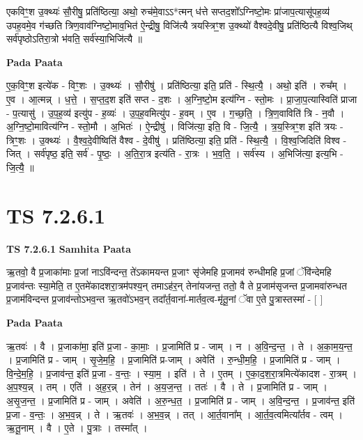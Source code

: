 \documentclass[17pt]{extarticle}
\begin{document}
एकविꣳ॒॒श उ॒क्थ्यः॑ सौ॒रीषु॒ प्रति॑ष्ठित्या॒ अथो॒ रुच॑मे॒वाऽऽ*त्मन् ध॑त्ते सप्तद॒शो᳚ऽग्निष्टो॒मः प्रा॑जाप॒त्यासू॑पह॒व्य॑ उपह॒वमे॒व ग॑च्छति त्रिण॒वाव॑ग्निष्टो॒माव॒भित॑ ऐ॒न्द्रीषु॒ विजि॑त्यै त्रयस्त्रिꣳ॒॒श उ॒क्थ्यो॑ वैश्वदे॒वीषु॒ प्रति॑ष्ठित्यै विश्व॒जिथ् सर्व॑पृष्ठोऽतिरा॒त्रो भ॑वति॒ सर्व॑स्या॒भिजि॑त्यै ॥ \newline

\textbf{Pada Paata} \newline

ए॒क॒विꣳ॒॒श इत्ये॑क - विꣳ॒॒शः । उ॒क्थ्यः॑ । सौ॒रीषु॑ । प्रति॑ष्ठित्या॒ इति॒ प्रति॑ - स्थि॒त्यै॒ । अथो॒ इति॑ । रुच᳚म् । ए॒व । आ॒त्मन्न् । ध॒त्ते॒ । स॒प्त॒द॒श इति॑ सप्त - द॒शः । अ॒ग्नि॒ष्टो॒म इत्य॑ग्नि - स्तो॒मः । प्रा॒जा॒प॒त्यास्विति॑ प्राजा - प॒त्यासु॑ । उ॒प॒ह॒व्य॑ इत्यु॑प - ह॒व्यः॑ । उ॒प॒ह॒वमित्यु॑प - ह॒वम् । ए॒व । ग॒च्छ॒ति॒ । त्रि॒ण॒वाविति॑ त्रि - न॒वौ । अ॒ग्नि॒ष्टो॒मावित्य॑ग्नि - स्तो॒मौ । अ॒भितः॑ । ऐ॒न्द्रीषु॑ । विजि॑त्या॒ इति॒ वि - जि॒त्यै॒ । त्र॒य॒स्त्रिꣳ॒॒श इति॑ त्रयः - त्रिꣳ॒॒शः । उ॒क्थ्यः॑ । वै॒श्व॒दे॒वीष्विति॑ वैश्व - दे॒वीषु॑ । प्रति॑ष्ठित्या॒ इति॒ प्रति॑ - स्थि॒त्यै॒ । वि॒श्व॒जिदिति॑ विश्व - जित् । सर्व॑पृष्ठ॒ इति॒ सर्व॑ - पृ॒ष्ठः॒ । अ॒ति॒रा॒त्र इत्य॑ति - रा॒त्रः । भ॒व॒ति॒ । सर्व॑स्य । अ॒भिजि॑त्या॒ इत्य॒भि - जि॒त्यै॒ ॥  \newline




\section*{ TS 7.2.6.1 }

\textbf{TS 7.2.6.1 } \newline
\textbf{Samhita Paata} \newline

ऋ॒तवो॒ वै प्र॒जाका॑माः प्र॒जां नाऽवि॑न्दन्त॒ ते॑ऽकामयन्त प्र॒जाꣳ सृ॑जेमहि प्र॒जामव॑ रुन्धीमहि प्र॒जां ॅवि॑न्देमहि प्र॒जाव॑न्तः स्या॒मेति॒ त ए॒तमे॑कादशरा॒त्रम॑पश्य॒न् तमाऽह॑र॒न् तेना॑यजन्त॒ ततो॒ वै ते प्र॒जाम॑सृजन्त प्र॒जामवा॑रुन्धत प्र॒जाम॑विन्दन्त प्र॒जाव॑न्तोऽभव॒न्त ऋ॒तवो॑ऽभव॒न् तदा᳚र्त॒वाना॑-मार्तव॒त्व-मृ॑तू॒नां ॅवा ए॒ते पु॒त्रास्तस्मा॑ - [  ] \newline

\textbf{Pada Paata} \newline

ऋ॒तवः॑ । वै । प्र॒जाका॑मा॒ इति॑ प्र॒जा - का॒माः॒ । प्र॒जामिति॑ प्र - जाम् । न । अ॒वि॒न्द॒न्त॒ । ते । अ॒का॒म॒य॒न्त॒ । प्र॒जामिति॑ प्र - जाम् । सृ॒जे॒म॒हि॒ । प्र॒जामिति॑ प्र-जाम् । अवेति॑ । रु॒न्धी॒म॒हि॒ । प्र॒जामिति॑ प्र - जाम् । वि॒न्दे॒म॒हि॒ । प्र॒जाव॑न्त॒ इति॑ प्र॒जा - व॒न्तः॒ । स्या॒म॒ । इति॑ । ते । ए॒तम् । ए॒का॒द॒श॒रा॒त्रमित्ये॑कादश - रा॒त्रम् । अ॒प॒श्य॒न्न् । तम् । एति॑ । अ॒ह॒र॒न्न् । तेन॑ । अ॒य॒ज॒न्त॒ । ततः॑ । वै । ते । प्र॒जामिति॑ प्र - जाम् । अ॒सृ॒ज॒न्त॒ । प्र॒जामिति॑ प्र - जाम् । अवेति॑ । अ॒रु॒न्ध॒त॒ । प्र॒जामिति॑ प्र - जाम् । अ॒वि॒न्द॒न्त॒ । प्र॒जाव॑न्त॒ इति॑ प्र॒जा - व॒न्तः॒ । अ॒भ॒व॒न्न् । ते । ऋ॒तवः॑ । अ॒भ॒व॒न्न् । तत् । आ॒र्त॒वाना᳚म् । आ॒र्त॒व॒त्वमित्या᳚र्तव - त्वम् । ऋ॒तू॒नाम् । वै । ए॒ते । पु॒त्राः । तस्मा᳚त् ।  \newline
\end{document}
